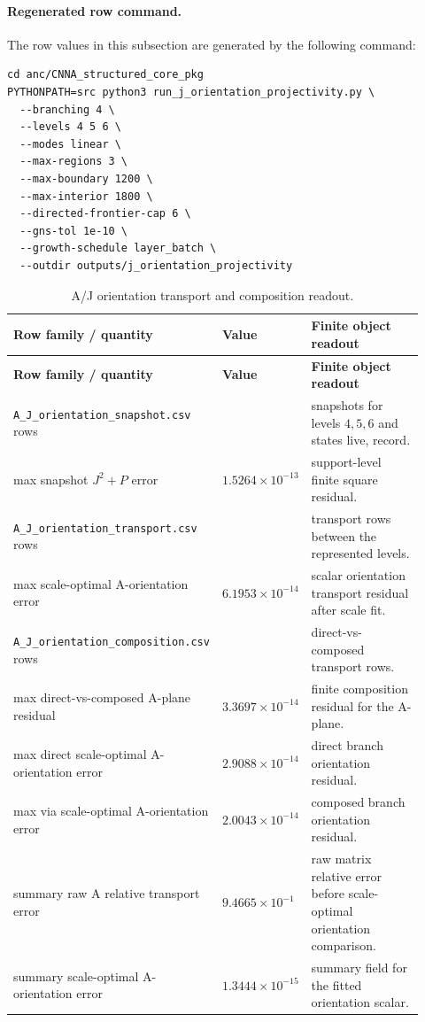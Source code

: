 \documentclass[11pt]{article}
\theoremstyle{remark}
\newcommand{\code}[1]{\texttt{#1}}
\numberwithin{equation}{section}
\begin{document}
\paragraph{Regenerated row command.}
The row values in this subsection are generated by the following command:
\begin{verbatim}
cd anc/CNNA_structured_core_pkg
PYTHONPATH=src python3 run_j_orientation_projectivity.py \
  --branching 4 \
  --levels 4 5 6 \
  --modes linear \
  --max-regions 3 \
  --max-boundary 1200 \
  --max-interior 1800 \
  --directed-frontier-cap 6 \
  --gns-tol 1e-10 \
  --growth-schedule layer_batch \
  --outdir outputs/j_orientation_projectivity
\end{verbatim}

\begin{longtable}{>{\raggedright\arraybackslash}p{0.34\linewidth}>{\raggedleft\arraybackslash}p{0.16\linewidth}>{\raggedright\arraybackslash}p{0.42\linewidth}}
\caption{A/J orientation transport and composition readout.}\label{tab:aj-orientation-readout}\\
\toprule
\textbf{Row family / quantity} & \textbf{Value} & \textbf{Finite object readout}\\
\midrule
\endfirsthead
\toprule
\textbf{Row family / quantity} & \textbf{Value} & \textbf{Finite object readout}\\
\midrule
\endhead
\code{A\_J\_orientation\_snapshot.csv} rows & 18 & snapshots for levels $4,5,6$ and states live, record.\\
\hline
max snapshot $J^2+P$ error & $1.5264\times10^{-13}$ & support-level finite square residual.\\
\hline
\code{A\_J\_orientation\_transport.csv} rows & 54 & transport rows between the represented levels.\\
\hline
max scale-optimal A-orientation error & $6.1953\times10^{-14}$ & scalar orientation transport residual after scale fit.\\
\hline
\code{A\_J\_orientation\_composition.csv} rows & 18 & direct-vs-composed transport rows.\\
\hline
max direct-vs-composed A-plane residual & $3.3697\times10^{-14}$ & finite composition residual for the A-plane.\\
\hline
max direct scale-optimal A-orientation error & $2.9088\times10^{-14}$ & direct branch orientation residual.\\
\hline
max via scale-optimal A-orientation error & $2.0043\times10^{-14}$ & composed branch orientation residual.\\
\hline
summary raw A relative transport error & $9.4665\times10^{-1}$ & raw matrix relative error before scale-optimal orientation comparison.\\
\hline
summary scale-optimal A-orientation error & $1.3444\times10^{-15}$ & summary field for the fitted orientation scalar.\\
\bottomrule
\end{longtable}
\end{document}
